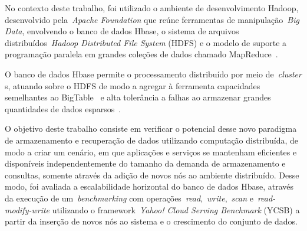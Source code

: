 \documentclass[12pt]{article}
\begin{document}
No contexto deste trabalho, foi utilizado o ambiente de desenvolvimento Hadoop, desenvolvido pela~\emph{Apache Foundation} que reúne ferramentas de manipulação~\emph{Big Data}, envolvendo o banco de dados Hbase, o sistema de arquivos distribuídos~\emph{Hadoop Distributed File System} (HDFS) e o modelo de suporte a programação paralela em grandes coleções de dados chamado MapReduce~\cite{hadoophbase}.

O banco de dados Hbase permite o processamento distribuído por meio de~\emph{cluster} s, atuando sobre o HDFS de modo a agregar à ferramenta capacidades semelhantes ao BigTable~\cite{chang2008bigtable} e alta tolerância a falhas ao armazenar grandes quantidades de dados esparsos~\cite{hadoophbase}.

O objetivo deste trabalho consiste em verificar o potencial desse novo paradigma de armazenamento e recuperação de dados utilizando computação distribuída, de modo a criar um cenário, em que aplicações e serviços se mantenham eficientes e disponíveis independentemente do tamanho da demanda de armazenamento e consultas, somente através da adição de novos nós ao ambiente distribuído. 
Desse modo, foi avaliada a escalabilidade horizontal do banco de dados Hbase, através da execução de um~\emph{benchmarking} com operações~\emph{read},~\emph{write},~\emph{scan} e~\emph{read-modify-write} utilizando o framework~\emph{Yahoo! Cloud Serving Benchmark} (YCSB) a partir da inserção de novos nós ao sistema e o crescimento do conjunto de dados.
\end{document}
